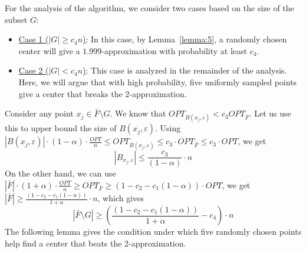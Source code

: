 \documentclass[11pt]{llncs}
\newcommand{\veps}{\varepsilon}
\begin{document}
For the analysis of the algorithm, we consider two cases based on the size of the subset $G$:
\begin{itemize}
\item \underline{Case 1 ($|G| \geq c_4 n$)}: In this case, by Lemma~\ref{lemma:5}, a randomly chosen center will give a $1.999$-approximation with probability at least $c_4$.
\item \underline{Case 2 ($|G| < c_4 n$)}: This case is analyzed in the remainder of the analysis. Here, we will argue that with high probability, five uniformly sampled points give a center that breaks the 2-approximation.
\end{itemize}
Consider any point $x_j \in \bar{F}\setminus G$. We know that $OPT_{B(x_j, \veps)} < c_3 OPT_{\bar{F}}$. Let us use this to upper bound the size of $B(x_j, \veps)$.
Using $|B(x_j, \veps)| \cdot (1-\alpha) \cdot \frac{OPT}{n} \leq OPT_{B(x_j, \veps)} \leq c_3 \cdot OPT_{\bar{F}} \leq c_3 \cdot OPT$, we get
$$
|B_{x_j, \veps}| \leq \frac{c_3}{(1-\alpha)} \cdot n
$$
On the other hand, we can use $|\bar{F}| \cdot (1+\alpha) \cdot \frac{OPT}{n} \geq OPT_{\bar{F}} \geq (1 - c_2 - c_1(1-\alpha)) \cdot OPT$, we get $|\bar{F}| \geq \frac{(1 - c_2 - c_1(1-\alpha))}{1+\alpha} \cdot n$, which gives
$$
|\bar{F} \setminus G| \geq \left(\frac{(1 - c_2 - c_1(1-\alpha))}{1+\alpha} - c_4 \right) \cdot n
$$
The following lemma gives the condition under which five randomly chosen points help find a center that beats the 2-approximation.
\end{document}
